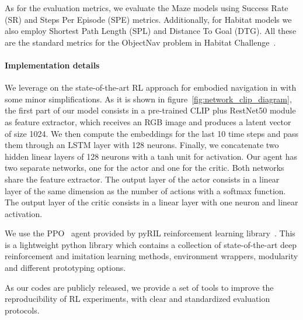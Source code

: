 As for the evaluation metrics, we evaluate the Maze models using Success Rate (SR) and Steps Per Episode (SPE) metrics.
Additionally, for Habitat models we also employ Shortest Path Length (SPL) and Distance To Goal (DTG).
All these are the standard metrics for the ObjectNav problem in Habitat Challenge~\cite{batra2020}.

\paragraph{Implementation details}
We leverage on the state-of-the-art RL approach for embodied navigation in \cite{khandelwal2022} with some minor simplifications.
As it is shown in figure~\ref{fig:network_clip_diagram}, the first part of our model consists in a pre-trained CLIP plus RestNet50 module as feature extractor, which receives an RGB image and produces a latent vector of size 1024.
We then compute the embeddings for the last 10 time steps and pass them through an LSTM layer with 128 neurons.
Finally, we concatenate two hidden linear layers of 128 neurons with a tanh unit for activation.
Our agent has two separate networks, one for the actor and one for the critic.
Both networks share the feature extractor.
The output layer of the actor consists in a linear layer of the same dimension as the number of actions with a softmax function.
The output layer of the critic consists in a linear layer with one neuron and linear activation.

We use the PPO~\cite{schulman2017} agent provided by pyRIL reinforcement learning library~\cite{pyRIL}.
This is a lightweight python library which contains a collection of state-of-the-art deep reinforcement and imitation learning methods, environment wrappers, modularity and different prototyping options.

As our codes are publicly released, we provide a set of tools to improve the reproducibility of RL experiments, with clear and standardized evaluation protocols.

